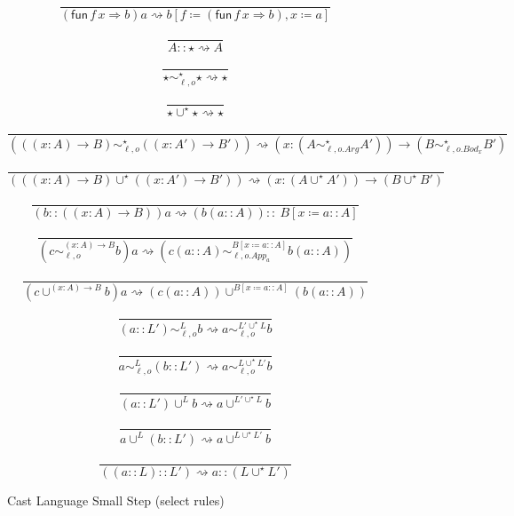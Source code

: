 \begin{figure}
\[
\frac{\ }{\left(\mathsf{fun}\,f\,x\Rightarrow b\right)a\rightsquigarrow b\left[f\coloneqq\left(\mathsf{fun}\,f\,x\Rightarrow b\right),x\coloneqq a\right]}
\]

\[
\frac{\ }{A::\star\rightsquigarrow A}
\]

\[
\frac{\ }{\star\sim_{\ell,o}^{\star}\star\rightsquigarrow\star}
\]

\[
\frac{\ }{\star\cup^{\star}\star\rightsquigarrow\star}
\]

\[
\frac{\ }{\left(\left(\left(x:A\right)\rightarrow B\right)\sim_{\ell,o}^{\star}\left(\left(x:A'\right)\rightarrow B'\right)\right)\rightsquigarrow\left(x:\left(A\sim_{\ell,o.Arg}^{\star}A'\right)\right)\rightarrow\left(B\sim_{\ell,o.Bod_{x}}^{\star}B'\right)}
\]

\[
\frac{\ }{\left(\left(\left(x:A\right)\rightarrow B\right)\cup^{\star}\left(\left(x:A'\right)\rightarrow B'\right)\right)\rightsquigarrow\left(x:\left(A\cup^{\star}A'\right)\right)\rightarrow\left(B\cup^{\star}B'\right)}
\]

\[
\frac{\ }{\left(b::\left(\left(x:A\right)\rightarrow B\right)\right)a\rightsquigarrow\left(b\left(a::A\right)\right)::\ B\left[x\coloneqq a::A\right]}
\]

\[
\frac{\ }{\left(c\sim_{\ell,o}^{\left(x:A\right)\rightarrow B}b\right)a\rightsquigarrow\left(c\left(a::A\right)\sim_{\ell,o.App_{a}}^{B\left[x\coloneqq a::A\right]}b\left(a::A\right)\right)}
\]

\[
\frac{\ }{\left(c\cup^{\left(x:A\right)\rightarrow B}b\right)a\rightsquigarrow\left(c\left(a::A\right)\right)\cup^{B\left[x\coloneqq a::A\right]}\left(b\left(a::A\right)\right)}
\]

\[
\frac{\ }{\left(a::L'\right)\sim_{\ell,o}^{L}b\rightsquigarrow a\sim_{\ell,o}^{L'\cup^{\star}L}b}
\]

\[
\frac{\ }{a\sim_{\ell,o}^{L}\left(b::L'\right)\rightsquigarrow a\sim_{\ell,o}^{L\cup^{\star}L'}b}
\]

\[
\frac{\ }{\left(a::L'\right)\cup^{L}b\rightsquigarrow a\cup^{L'\cup^{\star}L}b}
\]

\[
\frac{\ }{a\cup^{L}\left(b::L'\right)\rightsquigarrow a\cup^{L\cup^{\star}L'}b}
\]

\[
\frac{\ }{\left(\left(a::L\right)::L'\right)\rightsquigarrow a::\left(L\cup^{\star}L'\right)}
\]
\caption{Cast Language Small Step (select rules)}
\label{fig:cast-step}
\end{figure}

